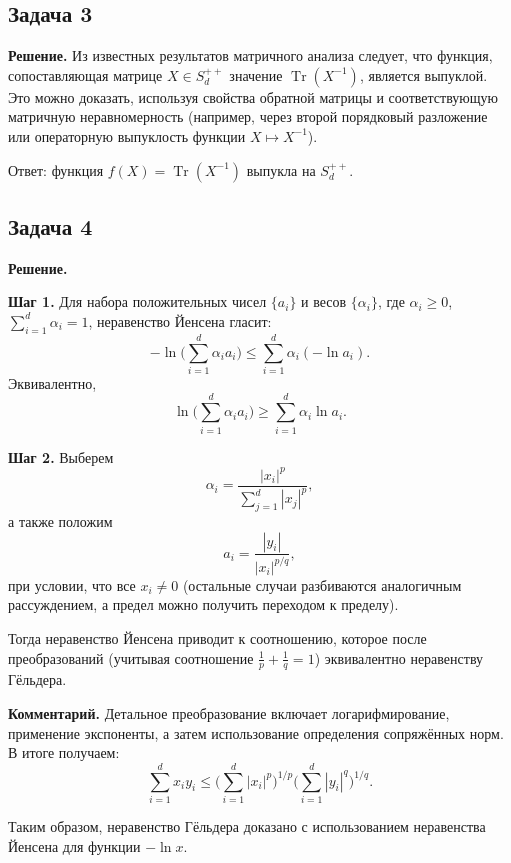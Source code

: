 \documentclass[a4paper,12pt]{article}
\begin{document}
	\vspace{0.5em}
	
	\subsection*{Задача 3}
	\textbf{Решение.} Из известных результатов матричного анализа следует, что функция, сопоставляющая матрице $X\in S_d^{++}$ значение $\operatorname{Tr}(X^{-1})$, является выпуклой. Это можно доказать, используя свойства обратной матрицы и соответствующую матричную неравномерность (например, через второй порядковый разложение или операторную выпуклость функции $X\mapsto X^{-1}$).
	
	Ответ: функция $f(X)=\operatorname{Tr}(X^{-1})$ выпукла на $S_d^{++}$.
	
	\vspace{0.5em}
	
	\subsection*{Задача 4}

	
	\textbf{Решение.}
	
	\textbf{Шаг 1.} Для набора положительных чисел $\{a_i\}$ и весов $\{\alpha_i\}$, где $\alpha_i\ge 0$, $\sum_{i=1}^d \alpha_i=1$, неравенство Йенсена гласит:
	\[
	-\ln\Biggl(\sum_{i=1}^d \alpha_i a_i\Biggr) \le \sum_{i=1}^d \alpha_i (-\ln a_i).
	\]
	Эквивалентно,
	\[
	\ln\Biggl(\sum_{i=1}^d \alpha_i a_i\Biggr) \ge \sum_{i=1}^d \alpha_i \ln a_i.
	\]
	
	\textbf{Шаг 2.} Выберем
	\[
	\alpha_i = \frac{|x_i|^p}{\sum_{j=1}^d |x_j|^p},
	\]
	а также положим
	\[
	a_i = \frac{|y_i|}{|x_i|^{p/q}},
	\]
	при условии, что все $x_i\neq 0$ (остальные случаи разбиваются аналогичным рассуждением, а предел можно получить переходом к пределу).
	
	Тогда неравенство Йенсена приводит к соотношению, которое после преобразований (учитывая соотношение $\frac{1}{p}+\frac{1}{q}=1$) эквивалентно неравенству Гёльдера.
	
	\textbf{Комментарий.} Детальное преобразование включает логарифмирование, применение экспоненты, а затем использование определения сопряжённых норм. В итоге получаем:
	\[
	\sum_{i=1}^d x_i y_i \le \Biggl(\sum_{i=1}^d |x_i|^p\Biggr)^{1/p}\Biggl(\sum_{i=1}^d |y_i|^q\Biggr)^{1/q}.
	\]
	
	Таким образом, неравенство Гёльдера доказано с использованием неравенства Йенсена для функции $-\ln x$.
	
	\vspace{1em}
	
	
\end{document}
